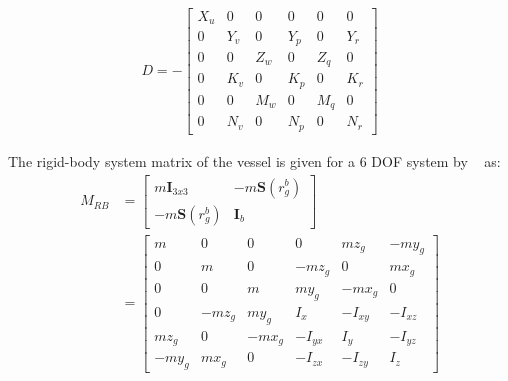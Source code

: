 \begin{align}
D =-
\begin{bmatrix}
X_u & 0 & 0 & 0 & 0 & 0\\
0 & Y_v & 0 & Y_p & 0 & Y_r\\
0 & 0 & Z_w & 0 & Z_q & 0\\
0 & K_v & 0 & K_p & 0 & K_r\\
0 & 0 & M_w & 0 & M_q & 0\\
0 & N_v & 0 & N_p & 0 & N_r
\end{bmatrix}
\label{eq:6dofd}
\end{align}


The rigid-body system matrix of the vessel is given for a 6 \ac{DOF} system by ~\citep[eq. (3.44)]{fossen} as:
\begin{align}
M_{RB} &=
\begin{bmatrix}
m\boldsymbol{I}_{3x3} & -m\boldsymbol{S}(r^b_g)\\
-m\boldsymbol{S}(r^b_g) & \boldsymbol{I}_b
\end{bmatrix}
\nonumber\\
&=
\begin{bmatrix}
m & 0 & 0 & 0 & mz_g & -my_g\\
0 & m & 0 & -mz_g & 0 & mx_g\\
0 & 0 & m & my_g & -mx_g & 0\\
0 & -mz_g & my_g & I_x & -I_{xy} & -I_{xz}\\
mz_g & 0 & -mx_g & -I_{yx} & I_y & -I_{yz}\\
-my_g & mx_g & 0 & -I_{zx} & -I_{zy} & I_z
\end{bmatrix}
\end{align}

